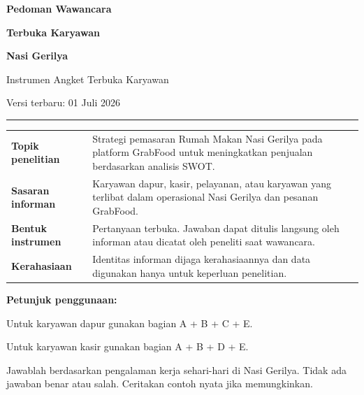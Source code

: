 \documentclass[10pt,a4paper]{article}
\begin{document}
\begin{titlepage}
\thispagestyle{empty}
\vspace*{10mm}
{\Huge\bfseries\textcolor{Primary}{Pedoman Wawancara}}\par
{\Huge\bfseries\textcolor{Primary}{Terbuka Karyawan}}\par
{\Huge\bfseries\textcolor{Primary}{Nasi Gerilya}}\par
\vspace{4mm}
{\Large\textcolor{Accent}{Instrumen Angket Terbuka Karyawan}}\par
\vspace{4mm}
{\large\textcolor{TextGray}{Versi terbaru: 01 Juli 2026}}\par
\vspace{7mm}
\textcolor{Accent}{\rule{0.92\linewidth}{1.4pt}}\par
\vspace{10mm}

\begin{tabularx}{\linewidth}{>{\bfseries\color{Primary}}p{36mm} Y}
Topik penelitian & Strategi pemasaran Rumah Makan Nasi Gerilya pada platform GrabFood untuk meningkatkan penjualan berdasarkan analisis SWOT.\\
Sasaran informan & Karyawan dapur, kasir, pelayanan, atau karyawan yang terlibat dalam operasional Nasi Gerilya dan pesanan GrabFood.\\
Bentuk instrumen & Pertanyaan terbuka. Jawaban dapat ditulis langsung oleh informan atau dicatat oleh peneliti saat wawancara.\\
Kerahasiaan & Identitas informan dijaga kerahasiaannya dan data digunakan hanya untuk keperluan penelitian.\\
\end{tabularx}

\vspace{9mm}
\colorbox{Soft}{%
  \parbox{\dimexpr\linewidth-2\fboxsep\relax}{%
    \raggedright
    \textbf{\textcolor{Primary}{Petunjuk penggunaan:}}\par
    Untuk karyawan dapur gunakan bagian A + B + C + E.\par
    Untuk karyawan kasir gunakan bagian A + B + D + E.
  }%
}

\vfill
{\small\textcolor{TextGray}{Jawablah berdasarkan pengalaman kerja sehari-hari di Nasi Gerilya. Tidak ada jawaban benar atau salah. Ceritakan contoh nyata jika memungkinkan.}}
\vspace*{8mm}
\end{titlepage}
\end{document}

